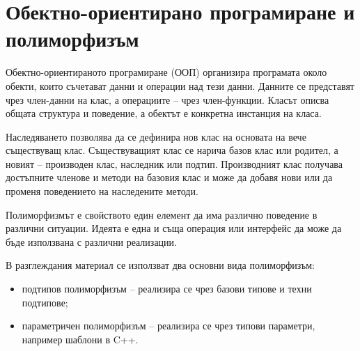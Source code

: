 \begin{konspekt}
\end{konspekt}

\section{Обектно-ориентирано програмиране и полиморфизъм}\label{s:17.1}

Обектно-ориентираното програмиране (ООП) организира програмата около обекти, които съчетават данни и операции над тези данни. Данните се представят чрез член-данни на клас, а операциите -- чрез член-функции. Класът описва общата структура и поведение, а обектът е конкретна инстанция на класа.

\begin{defn}[Наследяване]
Наследяването позволява да се дефинира нов клас на основата на вече съществуващ клас. Съществуващият клас се нарича базов клас или родител, а новият -- производен клас, наследник или подтип. Производният клас получава достъпните членове и методи на базовия клас и може да добавя нови или да променя поведението на наследените методи.
\end{defn}

\begin{defn}[Полиморфизъм]
Полиморфизмът е свойството един елемент да има различно поведение в различни ситуации. Идеята е една и съща операция или интерфейс да може да бъде използвана с различни реализации.
\end{defn}

В разглеждания материал се използват два основни вида полиморфизъм:

\begin{itemize}
    \item подтипов полиморфизъм -- реализира се чрез базови типове и техни подтипове;
    \item параметричен полиморфизъм -- реализира се чрез типови параметри, например шаблони в C++.
\end{itemize}


